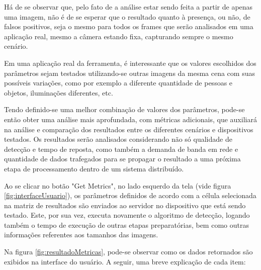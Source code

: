 Há de se observar que, pelo fato de a análise estar sendo feita a partir de apenas uma imagem, não é de se esperar que o resultado quanto à presença, ou não, de falsos positivos, seja o mesmo para todos os frames que serão analisados em uma aplicação real, mesmo a câmera estando fixa, capturando sempre o mesmo cenário.

Em uma aplicação real da ferramenta, é interessante que os valores escolhidos dos parâmetros sejam testados utilizando-se outras imagens da mesma cena com suas possíveis variações, como por exemplo a diferente quantidade de pessoas e objetos, iluminações diferentes, etc.

Tendo definido-se uma melhor combinação de valores dos parâmetros, pode-se então obter uma análise mais aprofundada, com métricas adicionais, que auxiliará na análise e comparação dos resultados entre os diferentes cenários e dispositivos testados. Os resultados serão analisados considerando não só qualidade de detecção e tempo de reposta, como também a demanda de banda em rede e quantidade de dados trafegados para se propagar o resultado a uma próxima etapa de processamento dentro de um sistema distribuído.

Ao se clicar no botão "Get Metrics", no lado esquerdo da tela (vide figura \ref{fig:interfaceUsuario}), os parâmetros definidos de acordo com a célula selecionada na matriz de resultados são enviados ao servidor no dispositivo que está sendo testado. Este, por sua vez, executa novamente o algoritmo de detecção, logando também o tempo de execução de outras etapas preparatórias, bem como outras informações referentes aos tamanhos das imagens.

Na figura \ref{fig:resultadoMetricas}, pode-se observar como os dados retornados são exibidos na interface do usuário. A seguir, uma breve explicação de cada item:

